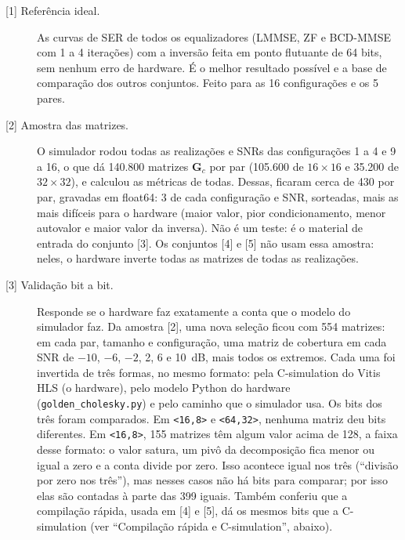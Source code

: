 \documentclass[11pt]{article}
\begin{document}
\begin{description}
  \item[{[1] Referência ideal.}] As curvas de SER de todos os equalizadores (LMMSE, ZF e
    BCD-MMSE com 1 a 4 iterações) com a inversão feita em ponto flutuante de 64 bits, sem
    nenhum erro de hardware. É o melhor resultado possível e a base de comparação dos outros
    conjuntos. Feito para as 16 configurações e os 5 pares.

  \item[{[2] Amostra das matrizes.}] O simulador rodou todas as realizações e SNRs das
    configurações 1 a 4 e 9 a 16, o que dá 140.800 matrizes $\mathbf G_c$ por par (105.600 de
    $16 \times 16$ e 35.200 de $32 \times 32$), e calculou as métricas de todas. Dessas, ficaram
    cerca de 430 por par, gravadas em float64: 3 de cada configuração e SNR, sorteadas, mais as
    mais difíceis para o hardware (maior valor, pior condicionamento, menor autovalor e maior
    valor da inversa). Não é um teste: é o material de entrada do conjunto [3]. Os conjuntos [4]
    e [5] não usam essa amostra: neles, o hardware inverte todas as matrizes de todas as
    realizações.

  \item[{[3] Validação bit a bit.}] Responde se o hardware faz exatamente a conta que o modelo
    do simulador faz. Da amostra [2], uma nova seleção ficou com 554 matrizes: em cada par, tamanho e
    configuração, uma matriz de cobertura em cada SNR de $-10$, $-6$, $-2$, 2, 6 e 10~dB, mais
    todos os extremos. Cada uma foi invertida de três formas, no
    mesmo formato: pela C-simulation do Vitis HLS (o hardware), pelo modelo Python do hardware
    (\texttt{golden\_cholesky.py}) e pelo caminho que o simulador usa. Os bits dos três foram
    comparados. Em \texttt{<16,8>} e \texttt{<64,32>}, nenhuma matriz deu bits diferentes. Em
    \texttt{<16,8>}, 155 matrizes têm algum valor acima de 128, a faixa desse formato: o valor
    satura, um pivô da decomposição fica menor ou igual a zero e a conta divide por zero. Isso
    acontece igual nos três (``divisão por zero nos três''), mas nesses casos não há bits para
    comparar; por isso elas são contadas à parte das 399 iguais. Também
    conferiu que a compilação rápida, usada em [4] e [5], dá os mesmos bits que a C-simulation
    (ver ``Compilação rápida e C-simulation'', abaixo).


\end{description}
\end{document}
